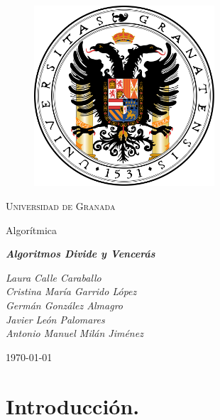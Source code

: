 \documentclass[11pt,a4paper]{article}
\begin{document}
	\begin{titlepage}

		\centering

		\begin{figure}[h]

			\centering
			\includegraphics[width=0.6\textwidth]{logo-ugr.png}
			
		\end{figure}

		\vspace{1cm}

		{\scshape\LARGE Universidad de Granada}

		\vspace{1cm}

		{\LARGE Algorítmica}

		\vspace{1cm}

		{\huge\bfseries\textit{Algoritmos Divide y Vencerás}}

		\vspace{1cm}

		{\itshape\large 
		Laura Calle Caraballo \\
		Cristina María Garrido López \\
		Germán González Almagro \\
		Javier León Palomares \\
		Antonio Manuel Milán Jiménez}

		\vfill

		{\Large\today}

	\end{titlepage}

\newpage

	\tableofcontents

\newpage

	\section{Introducción.}
\end{document}
